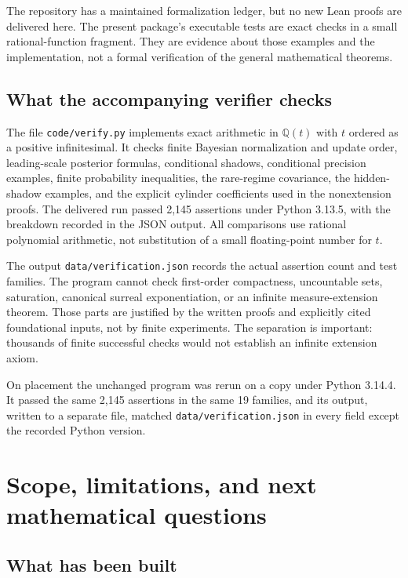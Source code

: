 \documentclass[11pt,a4paper]{article}
\numberwithin{equation}{section}
\theoremstyle{definition}
\theoremstyle{remark}
\newcommand{\Q}{\mathbb Q}
\begin{document}
The repository has a maintained formalization ledger, but no new Lean
proofs are delivered here. The present package's executable tests are
exact checks in a small rational-function fragment. They are evidence
about those examples and the implementation, not a formal verification
of the general mathematical theorems.

\subsection{What the accompanying verifier checks}\label{fsp:sub:verifier}

The file \texttt{code/verify.py} implements exact arithmetic in $\Q(t)$ with
$t$ ordered as a positive infinitesimal. It checks finite Bayesian
normalization and update order, leading-scale posterior formulas,
conditional shadows, conditional precision examples, finite probability
inequalities, the rare-regime covariance, the hidden-shadow examples,
and the explicit cylinder coefficients used in the nonextension proofs.
The delivered run passed 2,145 assertions under Python 3.13.5, with the
breakdown recorded in the JSON output.
All comparisons use rational polynomial arithmetic, not substitution of
a small floating-point number for $t$.

The output \texttt{data/verification.json} records the actual assertion count
and test families. The program cannot check first-order compactness,
uncountable sets, saturation, canonical surreal exponentiation, or an
infinite measure-extension theorem. Those parts are justified by the
written proofs and explicitly cited foundational inputs, not by finite
experiments. The separation is important: thousands of finite successful
checks would not establish an infinite extension axiom.

On placement the unchanged program was rerun on a copy under Python 3.14.4.
It passed the same 2,145 assertions in the same 19 families, and its output,
written to a separate file, matched \texttt{data/verification.json} in every
field except the recorded Python version.

\section{Scope, limitations, and next mathematical questions}
\label{fsp:sec:scope}

\subsection{What has been built}
\end{document}
